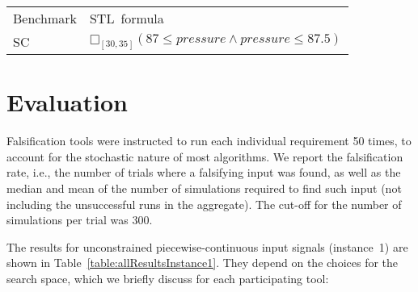 \documentclass[a4paper]{easychair}
\newcommand{\falsify}{falsify\xspace}
\begin{document}
	\begin{tabular}{ll}
		\toprule
		Benchmark & STL~formula \\
		\cmidrule(r){1-1} \cmidrule(l){2-2}
		SC  & $□_{[30,35]} (87\leq \mathit{pressure} \land \mathit{pressure}\leq 87.5)
		$ \\
		\bottomrule
	\end{tabular}


	\section{Evaluation}
    \label{sec:results}

	Falsification tools were instructed to run each individual
    requirement 50 times, to account for the stochastic nature of most
    algorithms.  We report the falsification rate, i.e., the number of
    trials where a falsifying input was found, as well as the median
    and mean of the number of simulations required to find such input
    (not including the unsuccessful runs in the aggregate).  The
    cut-off for the number of simulations per trial was
    300. %

    The results for unconstrained piecewise-continuous input signals (instance~1)
    are shown in Table~\ref{table:allResultsInstance1}.
    They depend on the choices for the search space,
    which we briefly discuss for each participating tool:
\end{document}
